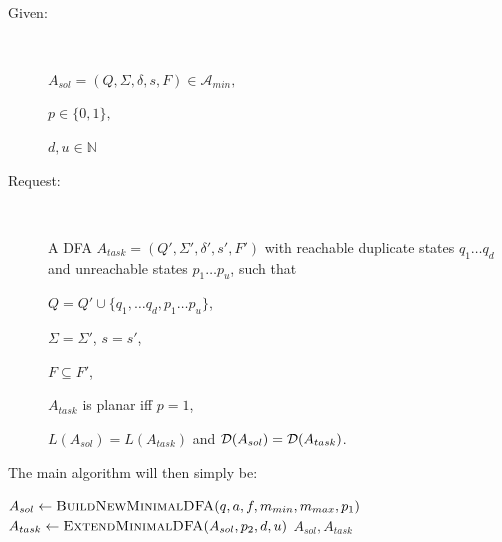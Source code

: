 \begin{definition}[ExtendMinimalDFA] \label{ch:1:def:ExtendMinimalDFA} $ $
	\begin{description}
		
		\item[Given:] $ $
		
		$A_{sol} = (Q, \Sigma, \delta, s, F) \in \mathcal{A}_{min},$
		
		$p \in \{0,1\},$
		
		$d, u \in \mathbb{N}$
		\item[Request:] $ $
		
		A DFA $A_{task} = (Q', \Sigma', \delta', s', F')$ with reachable duplicate states $q_1 \ldots q_d$ and unreachable states $p_1 \ldots p_u$, such that
		
		$Q = Q' \cup \{ q_1, \ldots q_d, p_1 \ldots p_u \}$,
		
		$\Sigma = \Sigma'$, $s = s'$,
		
		$F \subseteq F'$,
		
		$A_{task}$ is planar iff $p = 1$,
		
		$L(A_{sol}) = L(A_{task})$ and $\mathcal{D}(A_{sol}) = \mathcal{D}(A_{task})$.
	\end{description}
\end{definition}

\noindent The main algorithm will then simply be:
\vspace{0.2cm}
\begin{algorithmic}[1]
	\State $A_{sol} \gets \textsc{BuildNewMinimalDFA}(q, a, f, m_{min}, m_{max}, p_1)$
	\State $A_{task} \gets \textsc{ExtendMinimalDFA}(A_{sol}, p_2, d, u)$
	\State \Return $A_{sol}, A_{task}$
	\EndFunction
\end{algorithmic}


